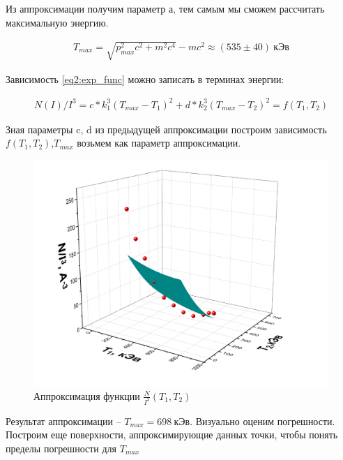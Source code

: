 \documentclass[a4paper,12pt]{article}
\begin{document}
\pagebreak

Из аппроксимации получим параметр а, тем самым мы сможем рассчитать максимальную энергию.

\begin{align*}
	T_{max} = \sqrt{p^2_{max} c^2 + m^2 c^4} - mc^2  \approx (535 \pm 40) \ кЭв
\end{align*}


Зависимость \ref{eq2:exp_func} можно записать в терминах энергии:

\begin{align*}
	N(I)/I^3 = c*k_1^3 (T_{max} - T_1)^2 + d*k_2^3 (T_{max} - T_2)^2 = f(T_1, T_2)
\end{align*}

Зная параметры c, d из предыдущей аппроксимации построим зависимость $f(T_1, T_2)$,$T_{max}$ возьмем как параметр аппроксимации.

\begin{figure}[h!]
	\centering
	\includegraphics[width=\linewidth]{graph5 (3D_approx)}
	\caption{Аппроксимация функции $\frac{N}{I^3}(T_1, T_2)$}
	\label{graph4:spectre_approx}
\end{figure}

Результат аппроксимации -- $T_{max} = 698 \ кЭв$. Визуально оценим погрешности. Построим еще поверхности, аппроксимирующие данных точки, чтобы понять пределы погрешности для $T_{max}$

\newpage
\end{document}
